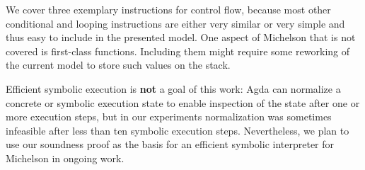 We cover three exemplary instructions for control flow,
because most other conditional and looping instructions
are either very similar or very simple and thus easy to include in the presented model.
One aspect of Michelson that is not covered is first-class functions.
Including them might require some reworking of the current model to store such values on the stack.

Efficient symbolic execution is \textbf{not} a goal of this work:
Agda can normalize a concrete or symbolic execution state to enable
inspection of the state after one or more execution steps, but in our
experiments normalization was sometimes infeasible after 
less than ten symbolic execution steps.
Nevertheless, we plan to use our soundness proof as the basis for an efficient
symbolic interpreter for Michelson in ongoing work.


